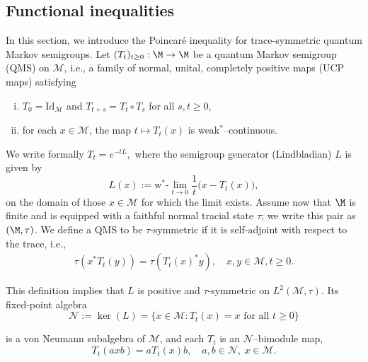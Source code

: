 \documentclass[sn-mathphys-num]{sn-jnl}
\begin{document}
\subsection{Functional inequalities}
In this section, we introduce the Poincar\'e inequality for trace-symmetric quantum Markov semigroups.
Let $(T_t)_{t\ge0}:\M\to\M$ be a quantum Markov semigroup (QMS) on $\mathcal{M}$, i.e., a family of normal, unital, completely positive maps (UCP maps)
satisfying
\begin{enumerate}[i)]
  \item $T_0 = \mathrm{Id}_{\mathcal{M}}$ and $T_{t+s} = T_t\circ T_s$ for all $s,t\ge0$,
  \item for each $x\in\mathcal{M}$, the map $t\mapsto T_t(x)$ is weak$^*$--continuous.
\end{enumerate}
We write formally
$T_t  =  e^{-tL},$
where the semigroup generator (Lindbladian) $L$
is given by
\begin{equation}\label{eq:lindbladian}
    L(x)
 :=
\mathrm{w}^*\text{-}   \lim_{t\to0}\frac{1}{t}\bigl(x - T_t(x)\bigr),
\end{equation}
on the domain of those $x\in\mathcal{M}$ for which the limit exists.
Assume now that $\M$ is finite and is equipped with a faithful normal tracial state $\tau$; we write this pair as $(\M,\tau)$. We define a QMS to be $\tau$-symmetric if it is self-adjoint with respect to the trace, i.e.,
\begin{equation}\label{eq:tau-sym}
\begin{aligned}
    \tau(x^* T_t(y)) = \tau(T_t(x)^* y), \quad   x, y \in \mathcal{M}, t \ge 0.
\end{aligned}
\end{equation}

This definition implies that $L$ is positive and $\tau$-symmetric on $L^2(\mathcal{M},\tau)$. Its fixed-point algebra
\[
\mathcal{N} := \ker(L) = \{ x \in \mathcal{M} : T_t(x) = x \text{ for all } t \ge 0 \}
\]

is a von Neumann subalgebra of $\mathcal{M}$, and each $T_t$ is an $\mathcal{N}$--bimodule map,
\[
T_t(a x b) = a T_t(x) b, \quad   a, b \in \mathcal{N},\ x \in \mathcal{M}.
\]
\end{document}
